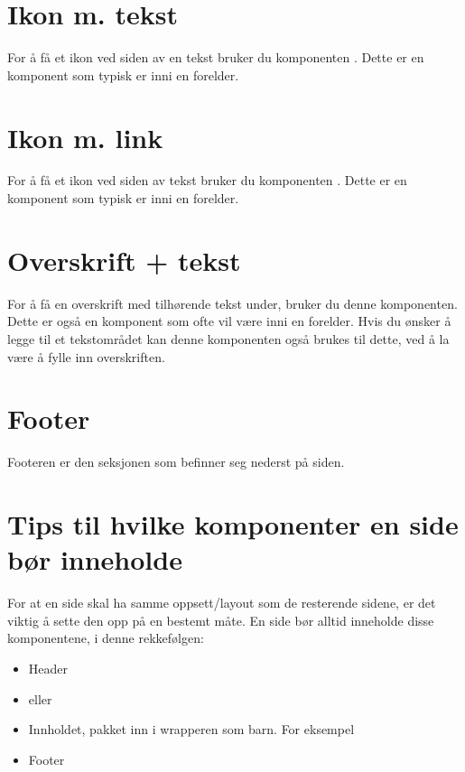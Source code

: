 \section{Ikon m. tekst}
For å få et ikon ved siden av en tekst bruker du komponenten . Dette er en komponent som typisk er inni en forelder.

\section{Ikon m. link}
For å få et ikon ved siden av tekst bruker du komponenten . Dette er en komponent som typisk er inni en forelder.

\section{Overskrift + tekst}
For å få en overskrift med tilhørende tekst under, bruker du denne komponenten. Dette er også en komponent som ofte vil være inni en forelder. Hvis du ønsker å legge til et tekstområdet kan denne komponenten også brukes til dette, ved å la være å fylle inn overskriften. 

\section{Footer}
Footeren er den seksjonen som befinner seg nederst på siden. 

\begin{figure}[H]
    \centering
    \label{fig:cms-footer}
\end{figure}

\section{Tips til hvilke komponenter en side bør inneholde}
For at en side skal ha samme oppsett/layout som de resterende sidene, er det viktig å sette den opp på en bestemt måte. En side bør alltid inneholde disse komponentene, i denne rekkefølgen:
\begin{itemize}
\item Header
\item {} eller 
\item Innholdet, pakket inn i wrapperen som barn. For eksempel 
\item Footer
\end{itemize}

